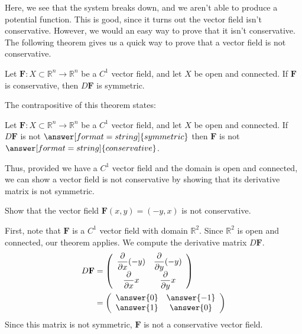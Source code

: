\documentclass{ximera}
\begin{document}
Here, we see that the system breaks down, and we aren't able to produce a potential function. This is good, since it turns out the vector field isn't conservative. However, we would an easy way to prove that it isn't conservative. The following theorem gives us a quick way to prove that a vector field is not conservative.

\begin{theorem}
Let $\mathbf{F}:X\subset\mathbb{R}^n\rightarrow \mathbb{R}^n$ be a $C^1$ vector field, and let $X$ be open and connected. If $\mathbf{F}$ is conservative, then $D\mathbf{F}$ is symmetric.
\end{theorem}

The contrapositive of this theorem states:

\begin{theorem}
Let $\mathbf{F}:X\subset\mathbb{R}^n\rightarrow \mathbb{R}^n$ be a $C^1$ vector field, and let $X$ be open and connected. If $D\mathbf{F}$ is not $\answer[format=string]{symmetric}$ then $\mathbf{F}$ is not $\answer[format=string]{conservative}$.
\end{theorem}

Thus, provided we have a $C^1$ vector field and the domain is open and connected, we can show a vector field is not conservative by showing that its derivative matrix is not symmetric.

\begin{example}
Show that the vector field $\mathbf{F}(x,y)=(-y,x)$ is not conservative.
\begin{explanation}
First, note that $\mathbf{F}$ is a $C^1$ vector field with domain $\mathbb{R}^2$. Since $\mathbb{R}^2$ is open and connected, our theorem applies. We compute the derivative matrix $D\mathbf{F}$.
\begin{align*}
D\mathbf{F} &= \left(\begin{array}{cc}
\dfrac{\partial}{\partial x} (-y) & \dfrac{\partial}{\partial y} (-y)\\
\dfrac{\partial}{\partial x} x & \dfrac{\partial}{\partial y} x\\
\end{array}\right)\\
&= \left(\begin{array}{cc}
\answer{0} & \answer{-1}\\
\answer{1} & \answer{0}\\
\end{array}\right)
\end{align*}
Since this matrix is not symmetric, $\mathbf{F}$ is not a conservative vector field.
\end{explanation}
\end{example}
\end{document}
